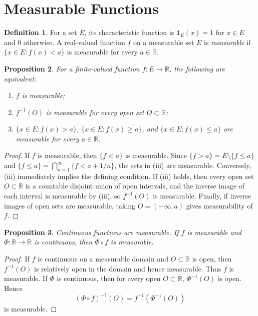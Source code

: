 \documentclass[11pt,openany]{book}
\numberwithin{equation}{chapter}
\theoremstyle{definition}
\newtheorem{definition}{Definition}[chapter]
\theoremstyle{plain}
\newtheorem{proposition}[definition]{Proposition}
\theoremstyle{remark}
\newcommand{\R}{\mathbb{R}}
\newcommand{\1}{\mathbf{1}}
\begin{document}
\section{Measurable Functions}

\begin{definition}
For a set \(E\), its characteristic function is \(\1_E(x)=1\) for \(x\in E\) and \(0\) otherwise.  A real-valued function \(f\) on a measurable set \(E\) is \emph{measurable} if \(\{x\in E:f(x)<a\}\) is measurable for every \(a\in\R\).
\end{definition}

\begin{proposition}
For a finite-valued function \(f:E\to\R\), the following are equivalent:
\begin{enumerate}[label=(\roman*)]
    \item \(f\) is measurable;
    \item \(f^{-1}(O)\) is measurable for every open set \(O\subset\R\);
    \item \(\{x\in E:f(x)>a\}\), \(\{x\in E:f(x)\ge a\}\), and \(\{x\in E:f(x)\le a\}\) are measurable for every \(a\in\R\).
\end{enumerate}
\end{proposition}

\begin{proof}
If \(f\) is measurable, then \(\{f<a\}\) is measurable.  Since \(\{f>a\}=E\setminus\{f\le a\}\) and \(\{f\le a\}=\bigcap_{n=1}^\infty\{f<a+1/n\}\), the sets in (iii) are measurable.  Conversely, (iii) immediately implies the defining condition.  If (iii) holds, then every open set \(O\subset\R\) is a countable disjoint union of open intervals, and the inverse image of each interval is measurable by (iii), so \(f^{-1}(O)\) is measurable.  Finally, if inverse images of open sets are measurable, taking \(O=(-\infty,a)\) gives measurability of \(f\).
\end{proof}

\begin{proposition}
Continuous functions are measurable.  If \(f\) is measurable and \(\Phi:\R\to\R\) is continuous, then \(\Phi\circ f\) is measurable.
\end{proposition}

\begin{proof}
If \(f\) is continuous on a measurable domain and \(O\subset\R\) is open, then \(f^{-1}(O)\) is relatively open in the domain and hence measurable.  Thus \(f\) is measurable.  If \(\Phi\) is continuous, then for every open \(O\subset\R\), \(\Phi^{-1}(O)\) is open.  Hence
\[
    (\Phi\circ f)^{-1}(O)=f^{-1}(\Phi^{-1}(O))
\]
is measurable.
\end{proof}
\end{document}
